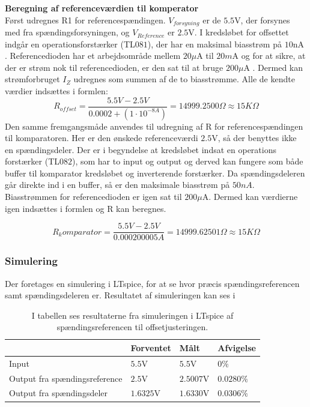 \noindent \textbf{Beregning af referenceværdien til komperator} \\
Først udregnes R1 for referencespændingen. $V_{forsyning}$ er de $5.5$V, der forsynes med fra spændingsforsyningen, og $V_{Reference}$ er $2.5$V. I kredsløbet for offsettet indgår en operationsforstærker (TL$081$), der har en maksimal biasstrøm på $10$nA \cite{Corporation1995}. Referencedioden har et arbejdsområde mellem $20\mu$A til $20m$A og for at sikre, at der er strøm nok til referencedioden, er den sat til at bruge $200\mu$A \cite{Instruments2005}. Dermed kan strømforbruget $I_{Z}$ udregnes som summen af de to biasstrømme. Alle de kendte værdier indsættes i formlen:
\begin{equation}
R_{offset} = \frac{5.5V - 2.5V}{0.0002 + (1 \cdot 10^{-8A})} = 14999.2500\Omega \approx 15K\Omega
\end{equation}
Den samme fremgangsmåde anvendes til udregning af R for referencespændingen til komparatoren. Her er den ønskede referenceværdi  $2.5$V, så der benyttes ikke en spændingsdeler. Der er i begyndelse at kredsløbet indsat en operations forstærker (TL$082$), som har to input og output og derved kan fungere som både buffer til komparator kredsløbet og inverterende forstærker. Da spændingsdeleren går direkte ind i en buffer, så er den maksimale biasstrøm på $50nA$. Biasstrømmen for referencedioden er igen sat til $200\mu$A. Dermed kan værdierne igen indsættes i formlen og R kan beregnes.

\begin{equation}
R_komparator = \frac{5.5V-2.5V}{0.000200005A} = 14999.62501\Omega \approx 15K\Omega 
\end{equation} 

\subsubsection{Simulering}
Der foretages en simulering i LTspice, for at se hvor præcis spændingsreferencen samt spændingsdeleren er. Resultatet af simuleringen kan ses i 

\begin{table}[]
\centering
\caption{I tabellen ses resultaterne fra simuleringen i LTspice af spændingsreferencen til offsetjusteringen.}
\label{Tab:SpaendigsRef_offset}
\begin{tabular}{|l|l|l|l|}
\hline
                              & Forventet & Målt & Afvigelse \\ \hline
Input                         & $5.5$V    &   $5.5$V   &   $0\%$         \\ \hline
Output fra spændingsreference & $2.5$V    &  $2.5007$V    &    $0.0280 \%$        \\ \hline
Output fra spændingsdeler     & $1.6325$V &  $1.6330$V     &       $0.0306 \%$     \\ \hline
\end{tabular}
\end{table}

